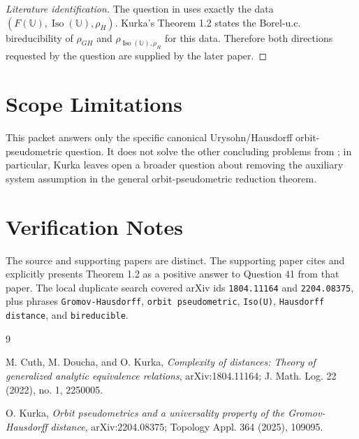 \documentclass[11pt]{article}
\begin{document}
\begin{proof}[Literature identification]
The question in \cite{CDK1} uses exactly the data
\((F(\mathbb U),\operatorname{Iso}(\mathbb U),\rho_H)\). Kurka's Theorem 1.2
states the Borel-u.c. bireducibility of \(\rho_{GH}\) and
\(\rho_{\operatorname{Iso}(\mathbb U),\rho_H}\) for this data. Therefore both
directions requested by the question are supplied by the later paper.
\end{proof}

\section*{Scope Limitations}

This packet answers only the specific canonical Urysohn/Hausdorff
orbit-pseudometric question. It does not solve the other concluding problems
from \cite{CDK1}; in particular, Kurka leaves open a broader question about
removing the auxiliary system assumption in the general orbit-pseudometric
reduction theorem.

\section*{Verification Notes}

The source and supporting papers are distinct. The supporting paper cites
\cite{CDK1} and explicitly presents Theorem 1.2 as a positive answer to
Question 41 from that paper. The local duplicate search covered arXiv ids
\texttt{1804.11164} and \texttt{2204.08375}, plus phrases
\texttt{Gromov-Hausdorff}, \texttt{orbit pseudometric},
\texttt{Iso(U)}, \texttt{Hausdorff distance}, and \texttt{bireducible}.

\begin{thebibliography}{9}

M. Cuth, M. Doucha, and O. Kurka,
\emph{Complexity of distances: Theory of generalized analytic equivalence relations},
arXiv:1804.11164; J. Math. Log. 22 (2022), no. 1, 2250005.

O. Kurka,
\emph{Orbit pseudometrics and a universality property of the Gromov-Hausdorff distance},
arXiv:2204.08375; Topology Appl. 364 (2025), 109095.

\end{thebibliography}
\end{document}
